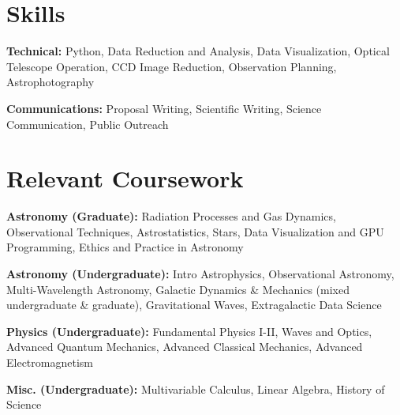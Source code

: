 \documentclass[letterpaper,11pt]{article}
\newcommand{\resumeSubHeadingListStart}{\begin{itemize}[leftmargin=0.15in, label={}]}
\newcommand{\resumeSubHeadingListEnd}{\end{itemize}}
\begin{document}

\section{Skills}
  \vspace{2pt}
  \resumeSubHeadingListStart
    \small{\item{
        \textbf{Technical:}{ Python, Data Reduction and Analysis, Data Visualization, Optical Telescope Operation, CCD Image Reduction, Observation Planning, Astrophotography} \\ \vspace{3pt}
        
        \textbf{Communications:}{ Proposal Writing, Scientific Writing, Science Communication, Public Outreach}
    }}
  \resumeSubHeadingListEnd




\section{Relevant Coursework}
  \vspace{2pt}
  \resumeSubHeadingListStart
    \small{\item{
        \textbf{Astronomy (Graduate):}{ Radiation Processes and Gas Dynamics, Observational Techniques, Astrostatistics, Stars, Data Visualization and GPU Programming, Ethics and Practice in Astronomy} \\ \vspace{3pt}
    
        \textbf{Astronomy (Undergraduate):}{ Intro Astrophysics, Observational Astronomy, Multi-Wavelength Astronomy, Galactic Dynamics \& Mechanics (mixed undergraduate \& graduate), Gravitational Waves, Extragalactic Data Science} \\ \vspace{3pt}

        \textbf{Physics (Undergraduate):}{ Fundamental Physics I-II, Waves and Optics, Advanced Quantum Mechanics, Advanced Classical Mechanics, Advanced Electromagnetism} \\ \vspace{3pt}

        \textbf{Misc. (Undergraduate):}{ Multivariable Calculus, Linear Algebra, History of Science}
    }}
  \resumeSubHeadingListEnd

\end{document}
